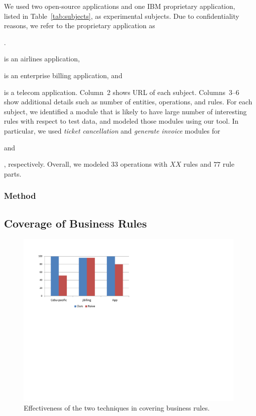 We used two open-source applications and one IBM proprietary application, listed
in Table~\ref{tab:subjects}, as experimental subjects. Due to confidentiality reasons,
we refer to the proprietary application as \subject{App}. \subject{Cebu-pacific} is
an airlines application, \subject{jBilling} is an enterprise billing application,
and \subject{App} is a telecom application. Column~2 shows URL of each subject.
Columns~3--6 show additional details such as number of entities, operations,
and rules. For each subject, we identified a module that is likely to have large
number of interesting rules with respect to test data, and modeled those modules using our tool. In particular,
we used \textit{ticket cancellation} and \textit{generate invoice} modules for \subject{Cebu-pacific} and 
\subject{jBilling}, respectively. Overall, we modeled $33$ operations with $XX$ rules and
$77$ rule parts.

\subsubsection{Method}


\subsection{Coverage of Business Rules}

\begin{figure}[t]
\centering
\includegraphics[width=\columnwidth, clip, trim = 18mm 120mm 140mm
  18mm]{Figs/Study-1.pdf}
\caption{Effectiveness of the two techniques in covering business rules.}
\label{fig:effectiveness}
\end{figure}

